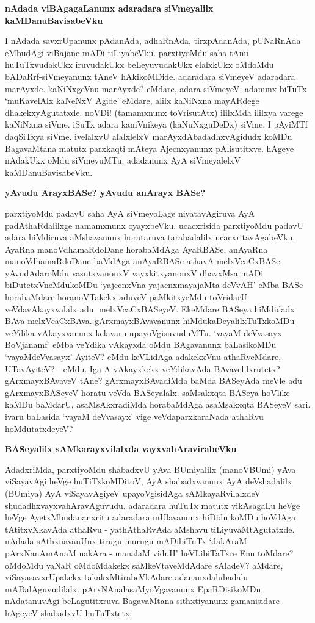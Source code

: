 \noindent
{\bf\large{nAdada viBAgagaLanunx adaradara siVmeyalilx kaMDanuBavisabeVku}}

I nAdada savxrUpanunx pAdanAda, adhaRnAda, tirxpAdanAda, pUNaRnAda eMbudAgi viBajane mADi tiLiyabeVku. parxtiyoMdu saha tAnu huTuTxvudakUkx iruvudakUkx beLeyuvudakUkx elalxkUkx oMdoMdu bADaRrf-siVmeyanunx tAneV hAkikoMDide. adaradara siVmeyeV adaradara marAyxde. kaNiNxgeVnu marAyxde? eMdare, adara siVmeyeV. adanunx biTuTx `muKavelAlx kaNeNxV Agide' eMdare, alilx kaNiNxna mayARdege dhakekxyAgutatxde. noVDi! (tamamxnunx toVrisutAtx) ililxMda ililxya varege kaNiNxna siVme. iSuTx adara kaniVnikeya (kaNuNxguDeDx) siVme. I pAyiMTf daqSiTxya siVme. ivelalxvU alalxlelxV marAyxdAbadadhxvAgidudx koMDu BagavaMtana matutx parxkaqti mAteya Ajecnxyanunx pAlisutitxve. hAgeye nAdakUkx oMdu siVmeyuMTu. adadanunx AyA siVmeyalelxV kaMDanuBavisabeVku.

\noindent
{\bf\large{yAvudu ArayxBASe? yAvudu anArayx BASe?}}\label{page174}

parxtiyoMdu padavU saha AyA siVmeyoLage niyatavAgiruva AyA padAthaRdalilxge namamxnunx oyayxbeVku. ucacxrisida parxtiyoMdu padavU adara hiMdiruva aMshavanunx horataruva tarahadalilx ucacxritavAgabeVku. AyaRna manoVdhamaRdoDane horabaMdAga AyaRBASe. anAyaRna manoVdhamaRdoDane baMdAga anAyaRBASe athavA melxVcaCxBASe. yAvudAdaroMdu vasutxvanonxV vayxkitxyanonxV dhavxMsa mADi biDutetxVneMdukoMDu `yajecnxVna yajacnxmayajaMta deVvAH' eMba BASe horabaMdare horanoVTakekx aduveV paMkitxyeMdu toVridarU veVdavAkayxvalalx adu. melxVcaCxBASeyeV. EkeMdare BASeya hiMdidadx BAva melxVcaCxBAva. gArxmayxBAvavanunx hiMdukaDeyalilxTuTxkoMDu veYdika vAkayxvanunx kelavaru upayoVgisuvuduMTu. `vayaM deVvasayx BoVjanamf' eMba veYdika vAkayxda oMdu BAgavanunx baLasikoMDu `vayaMdeVvasayx' AyiteV? eMdu keVLidAga adakekxVnu athaRveMdare, UTavAyiteV? - eMdu. Iga A vAkayxkekx veYdikavAda BAvavelilxrutetx? gArxmayxBAvaveV tAne? gArxmayxBAvadiMda baMda BASeyAda meVle adu gArxmayxBASeyeV horatu veVda BASeyalalx. saMsakxqta BASeya hoVlike kaMDu baMdarU, asaMsAkxradiMda horabaMdAga asaMsakxqta BASeyeV sari. ivaru baLasida `vayaM deVvasayx' vige veVdaparxkaraNada athaRvu hoMdutatxdeyeV?

\noindent
{\bf\large{BASeyalilx sAMkarayxvilalxda vayxvahAravirabeVku}}\label{page174}

AdadxriMda, parxtiyoMdu shabadxvU yAva BUmiyalilx (manoVBUmi) yAva viSayavAgi heVge huTiTxkoMDitoV, AyA shabadxvanunx AyA deVshadalilx (BUmiya) AyA viSayavAgiyeV upayoVgisidAga sAMkayaRvilalxdeV shudadhxvayxvahAravAguvudu. adaradara huTuTx matutx vikAsagaLu heVge heVge AyetxMbudananxritu adaradara mUlavanunx hiDidu koMDu hoVdAga tAtitxvXkavAda athaRvu - yathAthaRvAda aMshavu tiLiyuvaMtAgutatxde. nAdada sAthxnavanUnx tirugu murugu mADibiTuTx `dakAraM pArxNanAmAnaM nakAra - manalaM viduH' heVLibiTaTxre Enu toMdare? oMdoMdu vaNaR oMdoMdakekx saMkeVtaveMdAdare sAladeV? aMdare, viSayasavxrUpakekx takakxMtirabeVkAdare adananxdalubadalu mADalAguvudilalx. pArxNAnalasaMyoVgavanunx EpaRDisikoMDu nAdatanuvAgi beLagutitxruva BagavaMtana sithxtiyanunx gamanisidare hAgeyeV shabadxvU huTuTxtetx.

